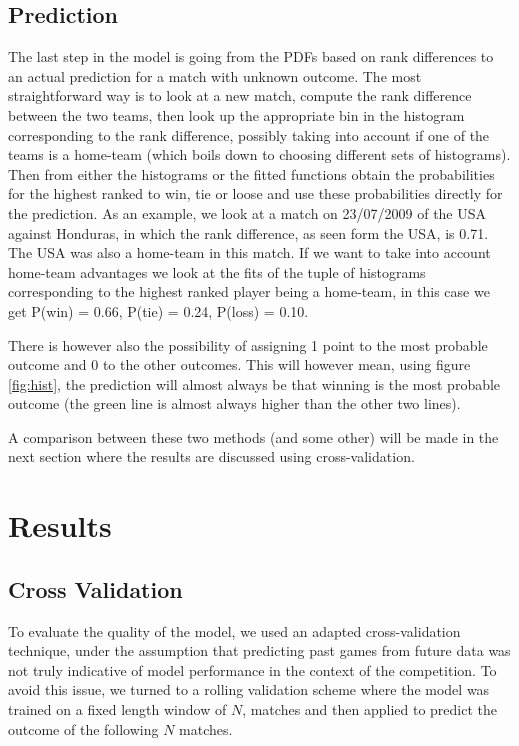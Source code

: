 \documentclass{llncs}
\begin{document}
\subsection{Prediction}
The last step in the model is going from the PDFs based on rank differences to an actual prediction for a match with unknown outcome. The most straightforward way is to look at a new match, compute the rank difference between the two teams, then look up the appropriate bin in the histogram corresponding to the rank difference, possibly taking into account if one of the teams is a home-team (which boils down to choosing different sets of histograms). Then from either the histograms or the fitted functions obtain the probabilities for the highest ranked to win, tie or loose and use these probabilities directly for the prediction. As an example, we look at a match  on 23/07/2009 of the USA against Honduras, in which the rank difference, as seen form the USA, is 0.71. The USA was also a home-team in this match. If we want to take into account home-team advantages we look at the fits of the tuple of histograms corresponding to the highest ranked player being a home-team, in this case we get P(win) = 0.66, P(tie) = 0.24, P(loss) = 0.10.

There is however also the possibility of assigning 1 point to the most probable outcome and 0 to the other outcomes. This will however mean, using figure \ref{fig:hist}, the prediction will almost always be that winning is the most probable outcome (the green line is almost always higher than the other two lines).

A comparison between these two methods (and some other) will be made in the next section where the results are discussed using cross-validation.

\section{Results}

\subsection{Cross Validation}
To evaluate the quality of the model, we used an adapted cross-validation technique, under the assumption that predicting past games from future data was not truly indicative of model performance in the context of the competition. To avoid this issue, we turned to a rolling validation scheme where the model was trained on a fixed length window of $N$, matches and then applied to predict the outcome of the following $N$ matches.
\end{document}

